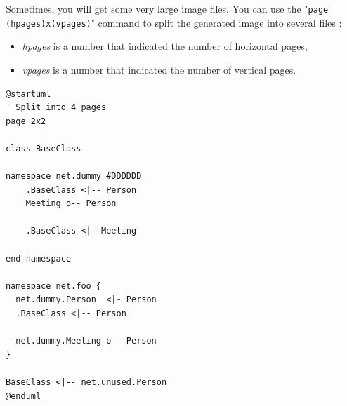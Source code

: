 Sometimes, you will get some very large image files.
You can use the "\texttt{page (hpages)x(vpages)}" command to split the generated
image into several files :
\begin{itemize}
  \item \textit{hpages} is a number that indicated the number of horizontal
  pages,
  \item \textit{vpages} is a number that indicated the number of vertical pages. 
\end{itemize}


\begin{lstlisting}
@startuml
' Split into 4 pages
page 2x2

class BaseClass

namespace net.dummy #DDDDDD
    .BaseClass <|-- Person
    Meeting o-- Person
    
    .BaseClass <|- Meeting

end namespace

namespace net.foo {
  net.dummy.Person  <|- Person
  .BaseClass <|-- Person

  net.dummy.Meeting o-- Person
}

BaseClass <|-- net.unused.Person
@enduml
\end{lstlisting}
		
\begin{center}
	\hspace*{4mm}
	\par
	\vskip 4mm
	\hspace*{4mm}
\end{center}
	